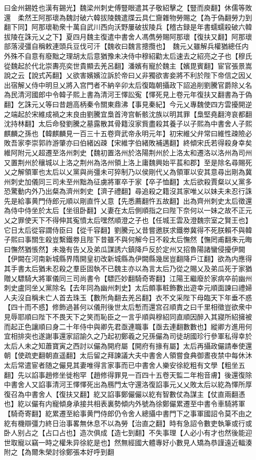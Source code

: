 曰金州錫姓也漢有錫光】魏梁州刺史傅豎眼遣其子敬紹擊之【豎而庾翻】休儒等敗還　柔然王阿那瓌為魏討破六韓拔陵魏遣牒云具仁齎雜物勞賜之【為于偽翻勞力到翻下同】阿那瓌勒衆十萬自武川西向沃野屢破拔陵兵【稽古録是年書蠕蠕殺破六韓拔陵在誅元乂之下】夏四月魏主復遣中書舍人馮儁勞賜阿那瓌【復扶又翻】阿那瓌部落浸彊自稱敕連頭兵豆伐可汗【魏收曰魏言摠攬也】　魏元乂雖解兵權猶總任内外殊不自意有廢黜之理胡太后意猶豫未决侍中穆紹勸太后速去之紹亮之子也【穆氏從魏起於代北崇夀亮奕世貴顯去羌呂翻】潘嬪有寵於魏主【嬪毘賓翻】宦官張景嵩說之云【說式芮翻】乂欲害嬪嬪泣訴於帝曰乂非獨欲害妾將不利於陛下帝信之因乂出宿解乂侍中明旦乂將入宫門者不納辛卯太后復臨朝攝政下詔追削劉騰官爵除乂名為民清河國郎中令韓子熙上書為清河王懌訟寃【懌死見上卷元年復扶又翻書為于偽翻】乞誅元乂等曰昔趙高柄秦令關東鼎沸【事見秦紀】今元乂專魏使四方雲擾開逆之端起於宋維成禍之末良由劉騰宜梟首洿宫斬骸沈族以明其罪【梟堅堯翻洿哀都翻沈持林翻】太后命發劉騰之墓露散其骨籍沒家貲盡殺其養子以子熙為中書舍人子熙麒麟之孫也【韓麒麟見一百三十五卷齊武帝永明元年】初宋維父弁常曰維性疎險必敗吾家李崇郭祚游肇亦曰伯緒凶疎【宋維字伯緒敗補邁翻】終傾宋氏若得殺身幸矣維阿附元乂超遷至洛州刺史【魏初置洛州於洛陽荆州於上洛太和遷洛以洛州為司州又置荆州於穰城以上洛之荆州為洛州領上洛上庸魏興始平萇和郡】至是除名尋賜死乂之解領軍也太后以乂黨與尚彊未可猝制乃以侯剛代乂為領軍以安其意尋出剛為冀州刺史加儀同三司未至州黜為征虜將軍卒于家【卒子恤翻】太后欲殺賈粲以乂黨多恐驚動内外乃出粲為濟州刺史【濟子禮翻】尋追殺之籍沒其家唯乂以妹夫未忍行誅先是給事黄門侍郎元順以剛直忤乂意【先悉薦翻忤五故翻】出為齊州刺史太后徵還為侍中侍坐於太后【坐徂卧翻】乂妻在太后側順指之曰陛下奈何以一妹之故不正元乂之罪使天下不得伸其寃憤太后嘿然順澄之子也【任城王雲及澄魏宗室之賢王也】它日太后從容謂侍臣曰【從千容翻】劉騰元乂昔嘗邀朕求鐵劵冀得不死朕賴不與韓子熙曰事關生殺豈繫鐵劵且陛下昔雖不與何解今日不殺太后憮然【憮罔甫翻朱元晦曰憮然猶悵然】未幾有告乂及弟瓜謀誘六鎮降戶反於定州又招魯陽諸蠻侵擾伊闕【伊闕在河南新城縣界隋開皇初改新城縣為伊闕縣幾居豈翻降戶江翻】欲為内應得其手書太后猶未忍殺之羣臣固執不已魏主亦以為言太后乃從之賜乂及弟瓜死于家猶贈乂驃騎大將軍儀同三司尚書令【驃匹妙翻騎奇寄翻】江陽王繼廢於家病卒前幽州刺史盧同坐乂黨除名【去年同為幽州刺史】太后頗事粧飾數出遊幸元順面諫曰禮婦人夫沒自稱未亡人首去珠玉【數所角翻去羌呂翻】衣不文采陛下母臨天下年垂不惑【四十而不惑】修飾過甚何以儀刑後世太后慙而還宫召順責之曰千里相徵豈欲衆中見辱耶順曰陛下不畏天下之笑而恥臣之一言乎順與穆紹同直順因醉入其寢所紹擁被而起正色讓順曰身二十年侍中與卿先君亟連職事【亟去連翻數數也】縱卿方進用何宜相排突也遂謝事還家詔諭久之乃起初鄭羲之兄孫儼為司徒胡國珍行參軍私得幸於太后人未之知蕭寶寅之西討以儼為開府屬【開府有掾有屬】太后再攝政儼請奉使還朝【使疏吏翻朝直遥翻】太后留之拜諫議大夫中書舍人領嘗食典御晝夜禁中每休沐太后常遣宦者随之儼見其妻唯得言家事而已中書舍人樂安徐紇粗有文學【粗坐五翻】先以諂事趙修坐徙枹罕【趙修得罪見一百四十五卷天監二年枹音膚】後還復除中書舍人又諂事清河王懌懌死出為鴈門太守還洛復諂事元乂乂敗太后以紇為懌所厚復召為中書舍人【復扶又翻】紇又諂事鄭儼儼以紇有智數仗為謀主【仗直兩翻憑也】紇以儼有内寵傾身承接共相表裏勢傾内外號為徐鄭儼累遷至中書令車騎將軍【騎奇寄翻】紇累遷至給事黄門侍郎仍令舍人總攝中書門下之事軍國詔令莫不由之紇有機辯彊力終日治事畧無休息不以為勞【治直之翻】時有急詔令數吏執筆或行或卧人别占之【占口占也】造次俱成【造七到翻】不失事理【人必小有才也然後能迎世取寵以竊一時之權朱异徐紇是也】然無經國大體專好小數見人矯為恭謹遠近輻湊附之【為爾朱榮討徐鄭張本好呼到翻